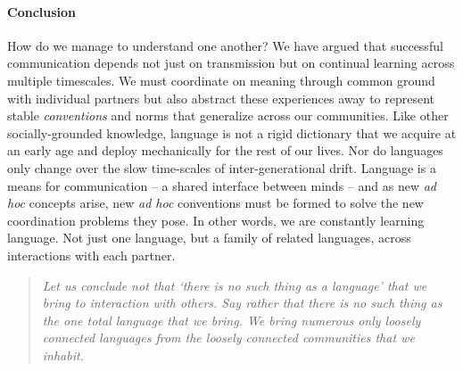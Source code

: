 \paragraph{Conclusion}

How do we manage to understand one another?
We have argued that successful communication depends not just on transmission but on continual learning across multiple timescales. 
We must coordinate on meaning through common ground with individual partners but also abstract these experiences away to represent stable \emph{conventions} and norms that generalize across our communities.
Like other socially-grounded knowledge, language is not a rigid dictionary that we acquire at an early age and deploy mechanically for the rest of our lives. 
Nor do languages only change over the slow time-scales of inter-generational drift.
Language is a means for communication -- a shared interface between minds -- and as new \emph{ad hoc} concepts arise, new \emph{ad hoc} conventions must be formed to solve the new coordination problems they pose.
In other words, we are constantly learning language. 
Not just one language, but a family of related languages, across interactions with each partner. 

\begin{quote}
\emph{Let us conclude not that ‘there is no such thing as a language’ that we bring to interaction with others. Say rather that there is no such thing as the one total language that we bring. We bring numerous only loosely connected languages from the loosely connected communities that we inhabit.} \cite{hacking1986nice}
\end{quote}
